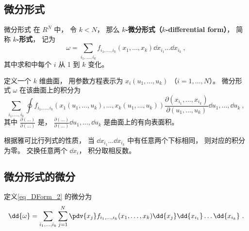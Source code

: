 \subsection{微分形式}
\begin{definition}{微分形式}
在 $R^N$ 中， 令 $k < N$， 那么 \textbf{$k$-微分形式（$k$-differential form）}， 简称 \textbf{$k$-形式}， 记为
\begin{equation}\label{eq_DForm_2}
\omega = \sum_{i_1,\dots,i_k} f_{i_1,\dots,i_k}(x_1,\dots,x_k) \dd{x_{i_1}}\dots\dd{x_{i_k}}~,
\end{equation}
其中求和中每个 $i$ 从 1 到 $k$ 变化。

定义一个 $k$ 维曲面， 用参数方程表示为 $x_i(u_1,\dots,u_k)$ （$i=1,\dots,N$）。 微分形式 $\omega$ 在该曲面上的积分为
\begin{equation}
\sum_{i_1,\dots,i_k} \oint f_{i_1,\dots,i_k}(x_1(u_1,\dots,u_k),\dots,x_k(u_1,\dots,u_k)) \frac{\partial(x_{i_1},\dots,x_{i_k})}{\partial(u_1,\dots,u_k)} \dd{u_1},\dots,\dd{u_k}~,
\end{equation}
其中 $\frac{\partial(\dots)}{\partial(\dots)}$ 是， $\frac{\partial(\dots)}{\partial(\dots)}\dd{u_1},\dots,\dd{u_k}$ 是曲面上的有向表面积。
\end{definition}
根据雅可比行列式的性质， 当 $\dd{x_{i_1}}\dots\dd{x_{i_k}}$ 中有任意两个下标相同， 则对应的积分为零。 交换任意两个 $\dd{x_i}$， 积分取相反数。

\subsection{微分形式的微分}
定义\autoref{eq_DForm_2} 的微分为
\begin{equation}
\dd{\omega} = \sum_{i_1,\dots,i_k}\sum_{j=1}^N \pdv{x_j} f_{i_1,\dots,i_k}(x_1,\dots,x_k) \dd{x_j}\dd{x_{i_1}}\dots\dd{x_{i_k}}~.
\end{equation}

